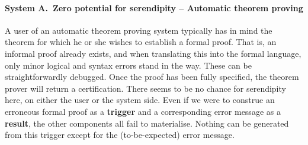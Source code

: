 \paragraph{System A.~Zero potential for serendipity -- Automatic
  theorem proving}
A user of an automatic theorem proving system typically has in mind
the theorem for which he or she wishes to establish a formal proof.
That is, an informal proof already exists, and when translating this
into the formal language, only minor logical and syntax errors stand
in the way.  These can be straightforwardly debugged.  Once the proof
has been fully specified, the theorem prover will return a
certification.  There seems to be no chance for serendipity here, on
either the user or the system side.  Even if we were to construe an
erroneous formal proof as a \textbf{trigger} and a corresponding error
message as a \textbf{result}, the other components all fail to
materialise.  Nothing can be generated from this trigger except for
the (to-be-expected) error message.

